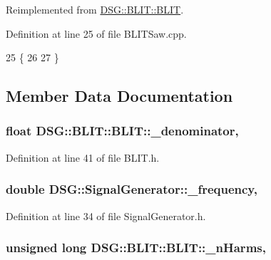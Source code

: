 Reimplemented from \hyperlink{classDSG_1_1BLIT_1_1BLIT_ab50b3ce86348b62f3c093d95cb5361d3}{D\-S\-G\-::\-B\-L\-I\-T\-::\-B\-L\-I\-T}.



Definition at line 25 of file B\-L\-I\-T\-Saw.\-cpp.


\begin{DoxyCode}
25                             \{
26     
27 \}\end{DoxyCode}


\subsection{Member Data Documentation}
\hypertarget{classDSG_1_1BLIT_1_1BLIT_aec52d8e6cca354ca19b3ea6b9bf02a9f}{
\subsubsection[{\-\_\-denominator}]{\setlength{\rightskip}{0pt plus 5cm}float D\-S\-G\-::\-B\-L\-I\-T\-::\-B\-L\-I\-T\-::\-\_\-denominator\hspace{0.3cm}{\ttfamily [protected]}, {\ttfamily [inherited]}}}\label{classDSG_1_1BLIT_1_1BLIT_aec52d8e6cca354ca19b3ea6b9bf02a9f}


Definition at line 41 of file B\-L\-I\-T.\-h.

\hypertarget{classDSG_1_1SignalGenerator_a67e296e3506dcdf09402c667cddff9ac}{
\subsubsection[{\-\_\-frequency}]{\setlength{\rightskip}{0pt plus 5cm}double D\-S\-G\-::\-Signal\-Generator\-::\-\_\-frequency\hspace{0.3cm}{\ttfamily [protected]}, {\ttfamily [inherited]}}}\label{classDSG_1_1SignalGenerator_a67e296e3506dcdf09402c667cddff9ac}


Definition at line 34 of file Signal\-Generator.\-h.

\hypertarget{classDSG_1_1BLIT_1_1BLIT_a487cca5adfe04a902c97aad8061c6c99}{
\subsubsection[{\-\_\-n\-Harms}]{\setlength{\rightskip}{0pt plus 5cm}unsigned long D\-S\-G\-::\-B\-L\-I\-T\-::\-B\-L\-I\-T\-::\-\_\-n\-Harms\hspace{0.3cm}{\ttfamily [protected]}, {\ttfamily [inherited]}}}\label{classDSG_1_1BLIT_1_1BLIT_a487cca5adfe04a902c97aad8061c6c99}


